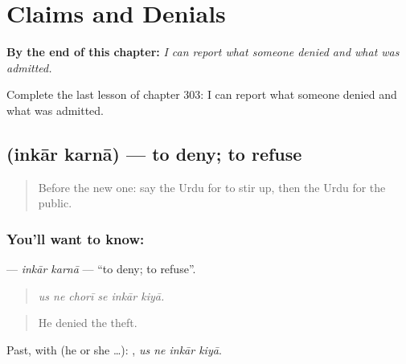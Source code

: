 
\chapter{Claims and Denials}
\label{ch:ur-claims-and-denials}

\begin{chapteropening}
\textbf{By the end of this chapter:} \emph{I can report what someone denied and what was admitted.}

Complete the last lesson of chapter 303: I can report what someone denied and what was admitted.
\end{chapteropening}

\section[\texorpdfstring{\ur{انکار} \ur{کرنا} (inkār karnā)}{انکار کرنا (inkār karnā)}]{  (inkār karnā) — to deny; to refuse}

\label{lesson:UR-C303-inkar-karna}



\begin{quote}
Before the new one: say the Urdu for to stir up, then the Urdu for the public.
\end{quote}

\subsection*{You'll want to know:  }
\textbf{ } — \emph{inkār karnā} — \textquotedblleft{}to deny; to refuse\textquotedblright{}.

\begin{quote}
     
\end{quote}

\begin{quote}
\emph{us ne chorī se inkār kiyā.}
\end{quote}

\begin{quote}
He denied the theft.
\end{quote}

Past, with  (he or she …):    , \emph{us ne inkār kiyā}.

